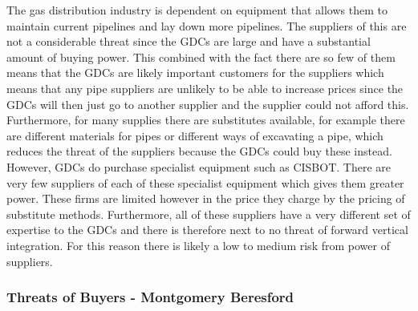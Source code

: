 \documentclass[11pt]{article}		%
\newcommand{\supercite}[1]{\textsuperscript{\cite{#1}}}		%
\begin{document}
                \hspace*{2ex}
		        The gas distribution industry is dependent on equipment that allows them to maintain current pipelines and lay down more pipelines.
		        The suppliers of this are not a considerable threat since the GDCs are large and have a substantial amount of buying power. This combined with the fact there are so few of them means that the GDCs are likely important customers for the suppliers which means that any pipe suppliers are unlikely to be able to increase prices since the GDCs will then just go to another supplier and the supplier could not afford this. Furthermore, for many supplies there are substitutes available, for example there are different materials for pipes or different ways of excavating a pipe, which reduces the threat of the suppliers because the GDCs could buy these instead.
                \\
                \hspace*{2ex}However, GDCs do purchase specialist equipment such as CISBOT. There are very few suppliers of each of these specialist equipment which gives them greater power. These firms are limited however in the price they charge by the pricing of substitute methods. Furthermore, all of these suppliers have a very different set of expertise to the GDCs and there is therefore next to no threat of forward vertical integration.
                For this reason there is likely a low to medium risk from power of suppliers.

		
		\subsubsection[Power of Buyers]{Threats of Buyers - Montgomery Beresford}
		
\end{document}
